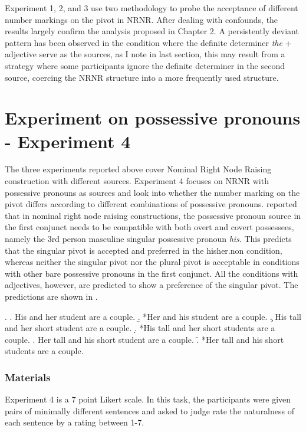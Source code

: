 \documentclass[
  11pt          %
  ,letterpaper  %
  ,center       %
  ,noupper      %
  ]{uconnthesis2}
\begin{document}
Experiment 1, 2, and 3 use two methodology to probe the acceptance of different number markings on the pivot in NRNR. After dealing with confounds, the results largely confirm the analysis proposed in Chapter 2. A persistently deviant pattern has been observed in the condition where the definite determiner \textit{the} + adjective serve as the sources, as I note in last section, this may result from a strategy where some participants ignore the definite determiner in the second source, coercing the NRNR structure into a more frequently used structure.

\section{Experiment on possessive pronouns - Experiment 4}

The three experiments reported above cover Nominal Right Node Raising construction with different sources. Experiment 4 focuses on NRNR with possessive pronouns as sources and look into whether the number marking on the pivot differs according to different combinations of possessive pronouns. \cite{Shen:ip2} reported that in nominal right node raising constructions, the possessive pronoun source in the first conjunct needs to be compatible with both overt and covert possessees, namely the 3rd person masculine singular possessive pronoun \textit{his}. This predicts that the singular pivot is accepted and preferred in the hisher.non condition, whereas neither the singular pivot nor the plural pivot is acceptable in conditions with other bare possessive pronouns in the first conjunct. All the conditions with adjectives, however, are predicted to show a preference of the singular pivot. The predictions are shown in \Next.

\ex.
\a. His and her student are a couple.
\b. *Her and his student are a couple.
\c. His tall and her short student are a couple.
\d. *His tall and her short students are a couple.
\e. Her tall and his short student are a couple.
\f. *Her tall and his short students are a couple.

\subsubsection{Materials}

Experiment 4 is a 7 point Likert scale. In this task, the participants were given pairs of minimally different sentences and asked to judge rate the naturalness of each sentence by a rating between 1-7. 
\end{document}
